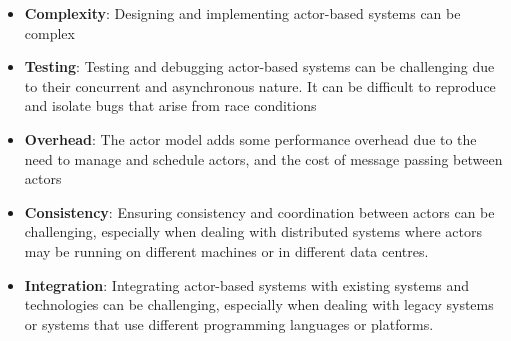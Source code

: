 \begin{itemize}
	\item \textbf{Complexity}: Designing and implementing actor-based systems can be complex
	\item \textbf{Testing}: Testing and debugging actor-based systems can be challenging due to their concurrent and asynchronous nature. It can be difficult to reproduce and isolate bugs that arise from race conditions
	\item \textbf{Overhead}: The actor model adds some performance overhead due to the need to manage and schedule actors, and the cost of message passing between actors
	\item \textbf{Consistency}: Ensuring consistency and coordination between actors can be challenging, especially when dealing with distributed systems where actors may be running on different machines or in different data centres.
	\item \textbf{Integration}: Integrating actor-based systems with existing systems and technologies can be challenging, especially when dealing with legacy systems or systems that use different programming languages or platforms.
\end{itemize}